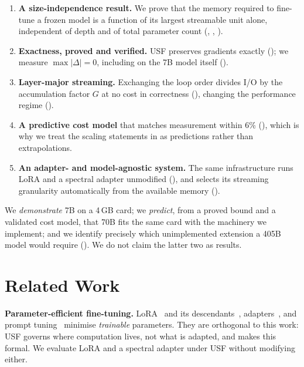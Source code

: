 \documentclass[journal]{IEEEtran}
\newcommand{\usf}{USF}
\begin{document}
\begin{enumerate}[leftmargin=*, label=\arabic*)]
\item \textbf{A size-independence result.} We prove that the memory required to fine-tune a frozen
model is a function of its largest streamable unit alone, independent of depth and of total
parameter count (, , ).
\item \textbf{Exactness, proved and verified.} \usf{} preserves gradients exactly
(); we measure $\max|\Delta|=0$, including on the 7B model itself
().
\item \textbf{Layer-major streaming.} Exchanging the loop order divides I/O by the accumulation
factor $G$ at no cost in correctness (), changing the performance regime
().
\item \textbf{A predictive cost model} that matches measurement within 6\% (),
which is why we treat the scaling statements in  as predictions rather than
extrapolations.
\item \textbf{An adapter- and model-agnostic system.} The same infrastructure runs LoRA and a
spectral adapter unmodified (), and selects its streaming granularity
automatically from the available memory ().
\end{enumerate}

We \emph{demonstrate} 7B on a 4\,GB card; we \emph{predict}, from a
proved bound and a validated cost model, that 70B fits the same card with the machinery we
implement; and we identify precisely which unimplemented extension a 405B model would require
(). We do not claim the latter two as results.

\section{Related Work}
\label{sec:related}

\textbf{Parameter-efficient fine-tuning.} LoRA~\cite{hu2022lora} and its
descendants~\cite{liu2024dora}, adapters~\cite{houlsby2019adapters}, and prompt
tuning~\cite{lester2021prompt} minimise \emph{trainable} parameters. They are orthogonal to this
work: \usf{} governs where computation lives, not what is adapted, and
 makes this formal. We evaluate LoRA and a spectral adapter under \usf{} without
modifying either.
\end{document}
